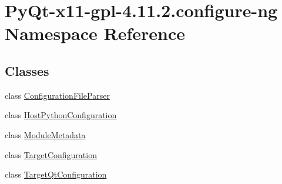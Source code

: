\hypertarget{namespacePyQt-x11-gpl-4_811_82_1_1configure-ng}{}\section{Py\+Qt-\/x11-\/gpl-\/4.11.2.configure-\/ng Namespace Reference}
\label{namespacePyQt-x11-gpl-4_811_82_1_1configure-ng}
\subsection*{Classes}
\begin{DoxyCompactItemize}
\item 
class \hyperlink{classPyQt-x11-gpl-4_811_82_1_1configure-ng_1_1ConfigurationFileParser}{Configuration\+File\+Parser}
\item 
class \hyperlink{classPyQt-x11-gpl-4_811_82_1_1configure-ng_1_1HostPythonConfiguration}{Host\+Python\+Configuration}
\item 
class \hyperlink{classPyQt-x11-gpl-4_811_82_1_1configure-ng_1_1ModuleMetadata}{Module\+Metadata}
\item 
class \hyperlink{classPyQt-x11-gpl-4_811_82_1_1configure-ng_1_1TargetConfiguration}{Target\+Configuration}
\item 
class \hyperlink{classPyQt-x11-gpl-4_811_82_1_1configure-ng_1_1TargetQtConfiguration}{Target\+Qt\+Configuration}
\end{DoxyCompactItemize}
